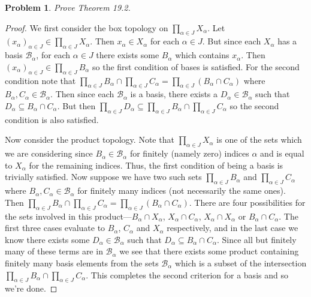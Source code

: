 \documentclass{article}
\newtheorem{problem}{Problem}
\begin{document}
\begin{problem}
Prove Theorem 19.2.
\end{problem}
\begin{proof}
We first consider the box topology on $\prod_{\alpha \in J} X_{\alpha}$. Let $(x_{\alpha})_{\alpha \in J} \in \prod_{\alpha \in J} X_{\alpha}$. Then $x_{\alpha} \in X_{\alpha}$ for each $\alpha \in J$. But since each $X_{\alpha}$ has a basis $\mathcal{B}_{\alpha}$, for each $\alpha \in J$ there exists some $B_{\alpha}$ which contains $x_{\alpha}$. Then $(x_{\alpha})_{\alpha \in J} \in \prod_{\alpha \in J} B_{\alpha}$ so the first condition of bases is satisfied. For the second condition note that $\prod_{\alpha \in J} B_{\alpha} \cap \prod_{\alpha \in J} C_{\alpha} = \prod_{\alpha \in J} (B_{\alpha} \cap C_{\alpha})$ where $B_{\alpha}, C_{\alpha} \in \mathcal{B}_{\alpha}$. Then since each $\mathcal{B}_{\alpha}$ is a basis, there exists a $D_{\alpha} \in \mathcal{B}_{\alpha}$ such that $D_{\alpha} \subseteq B_{\alpha} \cap C_{\alpha}$. But then $\prod_{\alpha \in J} D_{\alpha} \subseteq \prod_{\alpha \in J} B_{\alpha} \cap \prod_{\alpha \in J} C_{\alpha}$ so the second condition is also satisfied.

Now consider the product topology. Note that $\prod_{\alpha \in J} X_{\alpha}$ is one of the sets which we are considering since $B_{\alpha} \in \mathcal{B}_{\alpha}$ for finitely (namely zero) indices $\alpha$ and is equal to $X_{\alpha}$ for the remaining indices. Thus, the first condition of being a basis is trivially satisfied. Now suppose we have two such sets $\prod_{\alpha \in J} B_{\alpha}$ and $\prod_{\alpha \in J} C_{\alpha}$ where $B_{\alpha}, C_{\alpha} \in \mathcal{B}_{\alpha}$ for finitely many indices (not necessarily the same ones). Then $\prod_{\alpha \in J} B_{\alpha} \cap \prod_{\alpha \in J} C_{\alpha} = \prod_{\alpha \in J} (B_{\alpha} \cap C_{\alpha})$. There are four possibilities for the sets involved in this product---$B_{\alpha} \cap X_{\alpha}$, $X_{\alpha} \cap C_{\alpha}$, $X_{\alpha} \cap X_{\alpha}$ or $B_{\alpha} \cap C_{\alpha}$. The first three cases evaluate to $B_{\alpha}$, $C_{\alpha}$ and $X_{\alpha}$ respectively, and in the last case we know there exists some $D_{\alpha} \in \mathcal{B}_{\alpha}$ such that $D_{\alpha} \subseteq B_{\alpha} \cap C_{\alpha}$. Since all but finitely many of these terms are in $\mathcal{B}_{\alpha}$ we see that there exists some product containing finitely many basis elements from the sets $\mathcal{B}_{\alpha}$ which is a subset of the intersection $\prod_{\alpha \in J} B_{\alpha} \cap \prod_{\alpha \in J} C_{\alpha}$. This completes the second criterion for a basis and so we're done.
\end{proof}
\end{document}
